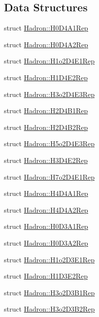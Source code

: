 \subsection*{Data Structures}
\begin{DoxyCompactItemize}
\item 
struct \mbox{\hyperlink{structHadron_1_1H0D4A1Rep}{Hadron\+::\+H0\+D4\+A1\+Rep}}
\item 
struct \mbox{\hyperlink{structHadron_1_1H0D4A2Rep}{Hadron\+::\+H0\+D4\+A2\+Rep}}
\item 
struct \mbox{\hyperlink{structHadron_1_1H1o2D4E1Rep}{Hadron\+::\+H1o2\+D4\+E1\+Rep}}
\item 
struct \mbox{\hyperlink{structHadron_1_1H1D4E2Rep}{Hadron\+::\+H1\+D4\+E2\+Rep}}
\item 
struct \mbox{\hyperlink{structHadron_1_1H3o2D4E3Rep}{Hadron\+::\+H3o2\+D4\+E3\+Rep}}
\item 
struct \mbox{\hyperlink{structHadron_1_1H2D4B1Rep}{Hadron\+::\+H2\+D4\+B1\+Rep}}
\item 
struct \mbox{\hyperlink{structHadron_1_1H2D4B2Rep}{Hadron\+::\+H2\+D4\+B2\+Rep}}
\item 
struct \mbox{\hyperlink{structHadron_1_1H5o2D4E3Rep}{Hadron\+::\+H5o2\+D4\+E3\+Rep}}
\item 
struct \mbox{\hyperlink{structHadron_1_1H3D4E2Rep}{Hadron\+::\+H3\+D4\+E2\+Rep}}
\item 
struct \mbox{\hyperlink{structHadron_1_1H7o2D4E1Rep}{Hadron\+::\+H7o2\+D4\+E1\+Rep}}
\item 
struct \mbox{\hyperlink{structHadron_1_1H4D4A1Rep}{Hadron\+::\+H4\+D4\+A1\+Rep}}
\item 
struct \mbox{\hyperlink{structHadron_1_1H4D4A2Rep}{Hadron\+::\+H4\+D4\+A2\+Rep}}
\item 
struct \mbox{\hyperlink{structHadron_1_1H0D3A1Rep}{Hadron\+::\+H0\+D3\+A1\+Rep}}
\item 
struct \mbox{\hyperlink{structHadron_1_1H0D3A2Rep}{Hadron\+::\+H0\+D3\+A2\+Rep}}
\item 
struct \mbox{\hyperlink{structHadron_1_1H1o2D3E1Rep}{Hadron\+::\+H1o2\+D3\+E1\+Rep}}
\item 
struct \mbox{\hyperlink{structHadron_1_1H1D3E2Rep}{Hadron\+::\+H1\+D3\+E2\+Rep}}
\item 
struct \mbox{\hyperlink{structHadron_1_1H3o2D3B1Rep}{Hadron\+::\+H3o2\+D3\+B1\+Rep}}
\item 
struct \mbox{\hyperlink{structHadron_1_1H3o2D3B2Rep}{Hadron\+::\+H3o2\+D3\+B2\+Rep}}
\item 

\end{DoxyCompactItemize}
